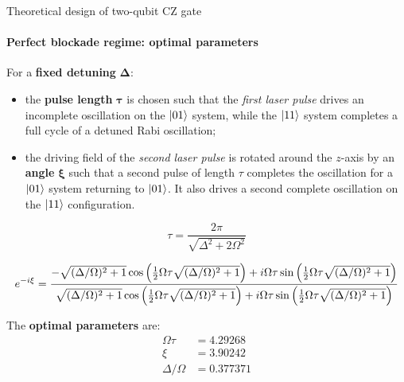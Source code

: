 \documentclass[8pt]{beamer}
\begin{document}
	\begin{frame}{Theoretical design of two-qubit CZ gate}
	\framesubtitle{Perfect blockade regime: optimal parameters}	

    For a \textbf{fixed detuning} $\pmb{\Delta}$:
    
    \begin{itemize}
        \item the \textbf{pulse length} $\pmb{\tau}$ is chosen such that the \textit{first laser pulse} drives an \alert{incomplete oscillation} on the $\ket{01}$ system, while the $\ket{11}$ system \alert{completes a full cycle} of a detuned Rabi oscillation;
        
        \item the driving field of the \textit{second laser pulse} is rotated around the $z$-axis by an \textbf{angle} $\pmb{\xi}$ such that a second pulse of length $\tau$ \alert{completes the oscillation} for a $\ket{01}$ system returning to $\ket{01}$. It also drives a \alert{second complete oscillation} on the $\ket{11}$ configuration.
    \end{itemize}
 
         \begin{equation}
            \tau = \frac{2\pi}{ \sqrt{\Delta^2+2\Omega^2} }
        \end{equation}      
        
        \begin{equation}
        e^{-i\xi} = \frac{-
        \sqrt{(\Delta/\Omega)^2+1} \cos\qty(\frac{1}{2}\Omega\tau \sqrt{(\Delta/\Omega)^2+1}) + i\Omega\tau\sin\qty(\frac{1}{2}\Omega\tau \sqrt{(\Delta/\Omega)^2+1})
        }{
        \sqrt{(\Delta/\Omega)^2+1} \cos\qty(\frac{1}{2}\Omega\tau \sqrt{(\Delta/\Omega)^2+1}) + i\Omega\tau\sin\qty(\frac{1}{2}\Omega\tau \sqrt{(\Delta/\Omega)^2+1})
        }
        \label{eq:exp_xi}
        \end{equation}
         
        \bigskip
        
        The \textbf{optimal parameters} are:
        \begin{subequations}
            \begin{align}
                \Omega\tau &= 4.29268 \label{eq:opt_val_Ot} \\
                \xi &= 3.90242 \label{eq:opt_val_xi} \\
                \Delta/\Omega &= 0.377371 \label{eq:opt_val_DO}
            \end{align}
            \label{eq:opt_val}
        \end{subequations}

	\end{frame}
	
\end{document}
